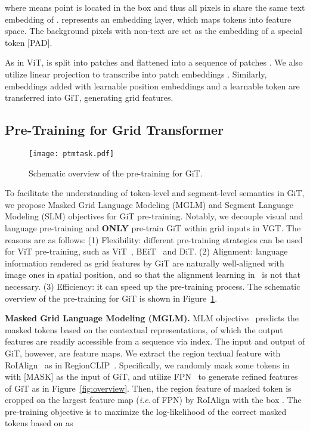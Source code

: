 \documentclass[10pt,twocolumn,letterpaper]{article}
\def\ie{\emph{i.e.}\,}
\begin{document}
where  means point  is located in the box  
and thus all pixels in  share the same text embedding  of .
 represents an embedding layer, which maps tokens into feature space.
The background pixels with non-text are set as the embedding of a special token [PAD].

As in ViT,  is split into   patches 
and flattened into a sequence of patches .
We also utilize linear projection to transcribe   into patch embeddings .
Similarly,  embeddings added with learnable  position embeddings and a learnable  token 
are transferred into GiT, generating  grid features.

\subsection{Pre-Training for Grid Transformer}

\begin{figure}[t]\centering
\texttt{[image: ptmtask.pdf]}
\caption{Schematic overview of the pre-training for GiT.}
 \label{fig:ptm}
\vspace{-2mm}
\end{figure}



To facilitate the  understanding of token-level and segment-level semantics in GiT,
we propose Masked Grid Language Modeling (MGLM) and Segment Language Modeling (SLM) objectives for GiT pre-training.
Notably, we decouple visual and language pre-training and \textbf{ONLY} pre-train GiT within grid inputs in VGT.
The reasons are as follows:
(1) Flexibility: different pre-training strategies can be used for ViT pre-training, such as ViT~\cite{vit}, BEiT~\cite{bao2021beit} and DiT\cite{li2022dit}.
(2) Alignment: language information rendered as  grid features by GiT are naturally well-aligned with image ones in spatial position, and so that the alignment learning in~\cite{xu2020layoutlmv2,huang2022layoutlmv3} is not that necessary.
(3) Efficiency: it can speed up the pre-training process.
The schematic overview of the pre-training for GiT is shown in Figure~\ref{fig:ptm}.


\noindent
\textbf{Masked Grid Language Modeling (MGLM).}
MLM objective~\cite{devlin2018bert} predicts the masked tokens based on the contextual representations, 
of which the output features are readily accessible from a  sequence via index.
The input and output of GiT, however, are  feature maps.
We extract the region textual feature with RoIAlign~\cite{maskrcnn} as in RegionCLIP~\cite{regionclip}.
Specifically, we randomly mask some tokens in  with [MASK] as the input of GiT,
and utilize FPN~\cite{FPN} to generate refined features of GiT as in Figure~\ref{fig:overview}.
Then, the region feature  of masked token 
is cropped on the largest feature map (\ie  of FPN) by RoIAlign with the box .
The pre-training objective is to maximize the log-likelihood of the correct masked tokens  
based on   as
\end{document}
